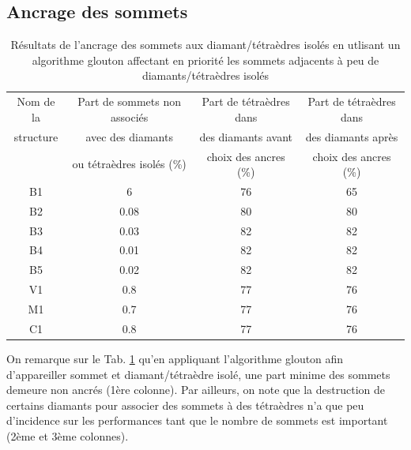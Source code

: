 \subsection{Ancrage des sommets}
\begin{table}[H]
\footnotesize
\centering
\begin{tabular}{|c | c | c | c |}
\hline
Nom de la & Part de sommets non associés & Part de tétraèdres dans  & Part de tétraèdres dans \\
structure&avec des diamants  & des diamants avant & des diamants après \\
& ou tétraèdres isolés (\%) & choix des ancres (\%)& choix des ancres (\%)\\
\hline
B1 & 6 & 76& 65 \\
B2 & 0.08& 80 & 80 \\
B3 & 0.03& 82 & 82\\
B4 & 0.01 & 82 & 82\\
B5 & 0.02 & 82 & 82\\
V1 & 0.8  & 77 & 76 \\
M1 & 0.7 & 77& 76\\
C1 & 0.8 & 77 & 76 \\
\hline  
\end{tabular}
\caption{Résultats de l'ancrage des sommets aux diamant/tétraèdres isolés en utlisant un algorithme glouton affectant en priorité les sommets adjacents à peu de diamants/tétraèdres isolés}
\label{tab:results_ancres}
\end{table}
\noindent
On remarque sur le Tab. \ref{tab:results_ancres} qu'en appliquant l'algorithme glouton afin d'appareiller sommet et diamant/tétraèdre isolé, une part minime des sommets demeure non ancrés (1ère colonne). Par ailleurs, on note que la destruction de certains diamants pour associer des sommets à des tétraèdres n'a que peu d'incidence sur les performances tant que le nombre de sommets est important (2ème et 3ème colonnes).

